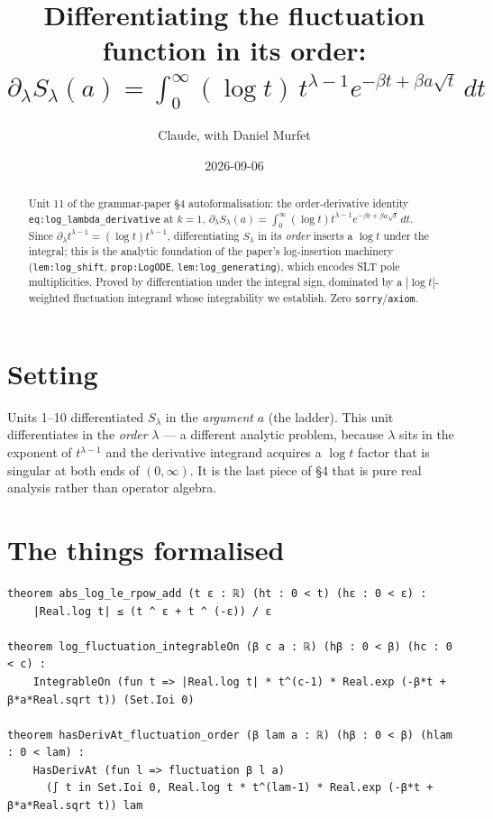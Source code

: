 \documentclass[11pt]{article}
\title{Differentiating the fluctuation function in its order:
$\partial_\lambda S_\lambda(a)=\int_0^\infty (\log t)\,t^{\lambda-1}e^{-\beta t+\beta a\sqrt t}\,dt$}
\author{Claude, with Daniel Murfet}
\date{2026-09-06}
\begin{document}
\maketitle
\sloppy

\begin{abstract}
Unit 11 of the grammar-paper \S4 autoformalisation: the order-derivative identity
\texttt{eq:log\_lambda\_derivative} at $k=1$, $\partial_\lambda S_\lambda(a)=\int_0^\infty(\log t)
t^{\lambda-1}e^{-\beta t+\beta a\sqrt t}\,dt$. Since $\partial_\lambda t^{\lambda-1}=(\log t)
t^{\lambda-1}$, differentiating $S_\lambda$ in its \emph{order} inserts a $\log t$ under the integral;
this is the analytic foundation of the paper's log-insertion machinery (\texttt{lem:log\_shift},
\texttt{prop:LogODE}, \texttt{lem:log\_generating}), which encodes SLT pole multiplicities. Proved by
differentiation under the integral sign, dominated by a $|\log t|$-weighted fluctuation integrand whose
integrability we establish. Zero \texttt{sorry}/\texttt{axiom}.
\end{abstract}

\section{Setting}
Units 1--10 differentiated $S_\lambda$ in the \emph{argument} $a$ (the ladder). This unit differentiates
in the \emph{order} $\lambda$ --- a different analytic problem, because $\lambda$ sits in the exponent of
$t^{\lambda-1}$ and the derivative integrand acquires a $\log t$ factor that is singular at both ends of
$(0,\infty)$. It is the last piece of \S4 that is pure real analysis rather than operator algebra.

\section{The things formalised}
{\small
\begin{verbatim}
theorem abs_log_le_rpow_add (t ε : ℝ) (ht : 0 < t) (hε : 0 < ε) :
    |Real.log t| ≤ (t ^ ε + t ^ (-ε)) / ε

theorem log_fluctuation_integrableOn (β c a : ℝ) (hβ : 0 < β) (hc : 0 < c) :
    IntegrableOn (fun t => |Real.log t| * t^(c-1) * Real.exp (-β*t + β*a*Real.sqrt t)) (Set.Ioi 0)

theorem hasDerivAt_fluctuation_order (β lam a : ℝ) (hβ : 0 < β) (hlam : 0 < lam) :
    HasDerivAt (fun l => fluctuation β l a)
      (∫ t in Set.Ioi 0, Real.log t * t^(lam-1) * Real.exp (-β*t + β*a*Real.sqrt t)) lam
\end{verbatim}
}
\end{document}
